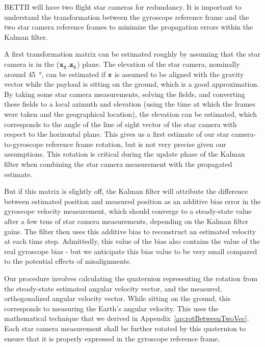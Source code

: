 BETTII will have two flight star cameras for redundancy. It is important to understand the transformation between the gyroscope reference frame and the two star camera reference frames to minimize the propagation errors within the Kalman filter. 

A first transformation matrix can be estimated roughly by assuming that the star camera is in the ($\textrm{\textbf{x}}_{\textrm{g}}$,$\textrm{\textbf{z}}_{\textrm{g}}$) plane. The elevation of the star camera, nominally around \SI{45}{\degree}, can be estimated if $\textrm{\textbf{z}}$ is assumed to be aligned with the gravity vector while the payload is sitting on the ground, which is a good approximation. By taking some star camera measurements, solving the fields, and converting these fields to a local azimuth and elevation (using the time at which the frames were taken and the geographical location), the elevation can be estimated, which corresponds to the angle of the line of sight vector of the star camera with respect to the horizontal plane. This gives us a first estimate of our star camera-to-gyroscope reference frame rotation, but is not very precise given our assumptions. This rotation is critical during the update phase of the Kalman filter when combining the star camera measurement with the propagated estimate.

But if this matrix is slightly off, the Kalman filter will attribute the difference between estimated position and measured position as an additive bias error in the gyroscope velocity measurement, which should converge to a steady-state value after a few tens of star camera measurements, depending on the Kalman filter gains. The filter then uses this additive bias to reconstruct an estimated velocity at each time step. Admittedly, this value of the bias also contains the value of the real gyroscope bias - but we anticipate  this bias value to be very small compared to the potential effects of misalignments.

Our procedure involves calculating the quaternion representing the rotation from the steady-state estimated angular velocity vector, and the measured, orthogonalized angular velocity vector. While sitting on the ground, this corresponds to measuring the Earth's angular velocity. This uses the mathematical technique that we derived in Appendix~\ref{ap:rotBetweenTwoVec}. Each star camera measurement shall be further rotated by this quaternion to ensure that it is properly expressed in the gyroscope reference frame. 

